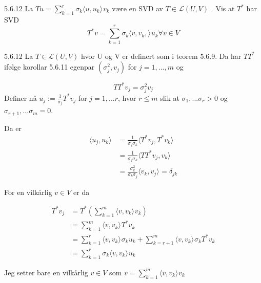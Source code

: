 \documentclass[a4paper,norsk]{article}
\renewcommand{\leq}{\leqslant}
\begin{document}
\begin{oppgavebox}{5.6.12}{}
La $ Tu = \sum_{ k=1 }^{ r } \sigma _{ k} \langle u, u_k \rangle_{  } v_k  $ være en SVD av $ T \in \mathcal{L }(U, V) $ . Vis at $ T^* $ har SVD 
\[
    T^* v = \sum_{ k=1 }^{ r } \sigma _{ k} \langle v, v_k,  \rangle_{  } u_k \forall v \in V
\]


\begin{proofbox}{5.6.12}{}
La $ T \in \mathcal{L}(U, V) $ hvor U og V er definert som i teorem 5.6.9. Da har $ TT^* $ ifølge korollar 5.6.11 egenpar $ \left( \sigma _{ j}^2, v_j  \right)  $  for $ j = 1, ..., m $ og

\[
    TT^*v_j = \sigma _{ j} ^2 v_j
\]
Definer nå $ u_j := \frac{ 1 }{ \sigma _{ j}} T^*v_j $  for $ j= 1, ... r $, hvor $ r \leq m $ slik at $ \sigma _{ 1} , ... \sigma _{ r} > 0 $ og $ \sigma _{ r+1} , ... \sigma _{ m} =0 $.

Da er 
\begin{align*}
    \langle u_j, u_k \rangle_{  } &= \frac{ 1 }{ \sigma _{ j} \sigma _{ k}  } \langle T^*v_j, T^*v_k \rangle_{  } \\
    &= \frac{ 1 }{ \sigma _{ j} \sigma _{ k} } \langle TT^* v_j, v_k \rangle_{  } \\
    &= \frac{ \sigma _{ k} ^2  }{ \sigma _{ k} \sigma _{ j}  } \langle v_k, v_j \rangle_{  } = \delta_{jk}
\end{align*}

For en vilkårlig $ v \in V $ er da

\begin{align*}
    T^* v_j &= T^*  \left(  \sum_{ k=1 }^{ m } \langle v, v_k \rangle_{  } v_k  \right) \\
    &= \sum_{ k=1 }^{ m } \langle v, v_k \rangle_{  } T^*v_k \\
    &= \sum_{ k=1 }^{ r } \langle v, v_k \rangle_{  } \sigma _{ k} u_k + \sum_{ k=r+1 }^{ m } \langle v, v_k \rangle_{  } \sigma _{ k} T^*v_k  \\
    &= \sum_{ k=1 }^{ r } \sigma _{ k} \langle v, v_k \rangle_{  } u_k
\end{align*}

Jeg setter bare en vilkårlig $ v \in V $ som $ v = \sum_{ k=1 }^{ m } \langle v, v_k \rangle_{  } v_k $ 
\end{proofbox}
\end{oppgavebox}
\end{document}
